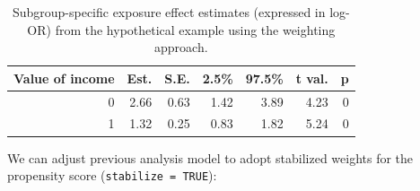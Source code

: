 \documentclass[
  letterpaper,
  DIV=11,
  numbers=noendperiod]{scrreprt}
\newenvironment{Shaded}{\begin{snugshade}}{\end{snugshade}}
\newcommand{\AttributeTok}[1]{\textcolor[rgb]{0.40,0.45,0.13}{#1}}
\newcommand{\ConstantTok}[1]{\textcolor[rgb]{0.56,0.35,0.01}{#1}}
\newcommand{\DecValTok}[1]{\textcolor[rgb]{0.68,0.00,0.00}{#1}}
\newcommand{\FunctionTok}[1]{\textcolor[rgb]{0.28,0.35,0.67}{#1}}
\newcommand{\NormalTok}[1]{\textcolor[rgb]{0.00,0.23,0.31}{#1}}
\newcommand{\OtherTok}[1]{\textcolor[rgb]{0.00,0.23,0.31}{#1}}
\newcommand{\SpecialCharTok}[1]{\textcolor[rgb]{0.37,0.37,0.37}{#1}}
\newcommand{\StringTok}[1]{\textcolor[rgb]{0.13,0.47,0.30}{#1}}
\begin{document}
\hypertarget{tbl-common-model}{}
\begin{table}[!h]
\caption{\label{tbl-common-model}Subgroup-specific exposure effect estimates (expressed in log-OR) from
the hypothetical example using the weighting approach. }\tabularnewline

\centering
\begin{tabular}{rrrrrrr}
\toprule
Value of income & Est. & S.E. & 2.5\% & 97.5\% & t val. & p\\
\midrule
0 & 2.66 & 0.63 & 1.42 & 3.89 & 4.23 & 0\\
1 & 1.32 & 0.25 & 0.83 & 1.82 & 5.24 & 0\\
\bottomrule
\end{tabular}
\end{table}

We can adjust previous analysis model to adopt stabilized weights for
the propensity score (\texttt{stabilize\ =\ TRUE}):

\begin{Shaded}
\end{Shaded}
\end{document}

